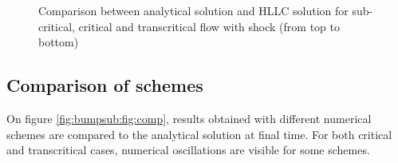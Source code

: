 \begin{figure}[H]
\begin{minipage}[t]{0.5\textwidth}
 \centering
\end{minipage}%
\begin{minipage}[t]{0.5\textwidth}
 \centering
\end{minipage}
\begin{minipage}[t]{0.5\textwidth}
 \centering
\end{minipage}%
\begin{minipage}[t]{0.5\textwidth}
 \centering
\end{minipage}
\begin{minipage}[t]{0.5\textwidth}
 \centering
\end{minipage}%
\begin{minipage}[t]{0.5\textwidth}
 \centering
\end{minipage}
 \caption{Comparison between analytical solution and  HLLC
 solution for sub-critical, critical and transcritical flow with shock (from top to bottom)}\label{fig:bumpsub:fig:hfr}
\end{figure}


\subsection{Comparison of schemes}
On figure \ref{fig:bumpsub:fig:comp}, results obtained with different numerical schemes are compared to the analytical solution at final time. For both critical and transcritical cases, numerical oscillations are visible for some schemes.

